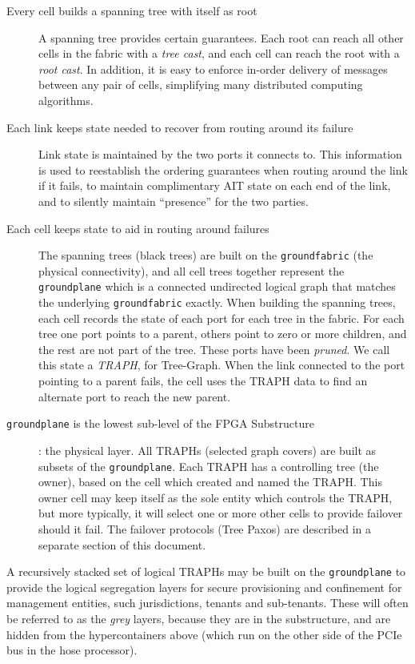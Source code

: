 \documentclass[../OAE-SPEC-MAIN.tex]{subfiles}
\begin{document}
\begin{description}
	\item [Every cell builds a spanning tree with itself as root] A spanning tree provides certain guarantees.  Each root can reach all other cells in the fabric with a \emph{tree cast}, and each cell can reach the root with a \emph{root cast}.  In addition, it is easy to enforce in-order delivery of messages between any pair of cells, simplifying many distributed computing algorithms.

	\item [Each link keeps state needed to recover from routing around its failure] Link state is maintained by the two ports it connects to.  This information is used to reestablish the ordering guarantees when routing around the link if it fails, to maintain complimentary AIT state on each end of the link, and to silently maintain ``presence'' for the two parties.

	\item [Each cell keeps state to aid in routing around failures] The spanning trees (black trees) are built on the \texttt{groundfabric} (the physical connectivity), and all cell trees together represent the \texttt{groundplane} which is a connected undirected logical graph that matches the underlying \texttt{groundfabric} exactly.  When building the spanning trees, each cell records the state of each port for each tree in the fabric.  For each tree one port points to a parent, others point to zero or more children, and the rest are not part of the tree.   These ports have been \emph{pruned}.  We call this state a \emph{TRAPH}, for Tree-Graph.  When the link connected to the port pointing to a parent fails, the cell uses the TRAPH data to find an alternate port to reach the new parent.

	\item  [\texttt{groundplane} is the lowest sub-level of the FPGA Substructure]: the physical layer.
All TRAPHs (selected graph covers) are built as subsets of the \texttt{groundplane}. Each TRAPH has a controlling tree (the owner), based on the cell which created and named the TRAPH. This owner cell may keep itself as the sole entity which controls the TRAPH,  but more typically, it will select one or more other cells to provide failover should it fail. The failover protocols (Tree Paxos) are described in a separate section of this document.
	
\end{description}

A recursively stacked set of logical TRAPHs may be built on the \texttt{groundplane} to provide the logical segregation layers for secure provisioning and confinement for management entities, such jurisdictions, tenants and sub-tenants. These will often be referred to as the \emph{grey} layers, because they are in the substructure, and are hidden from the  hypercontainers above (which run on the other side of the PCIe bus in the hose processor).
\end{document}
